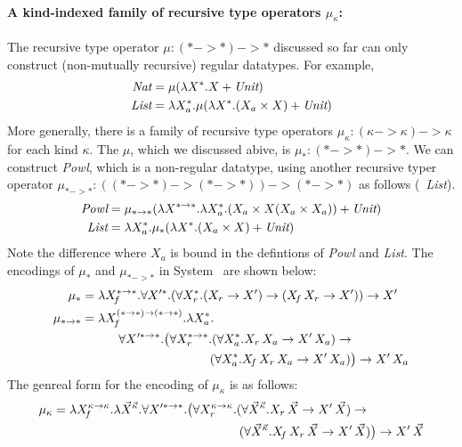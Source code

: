 \paragraph{A kind-indexed family of recursive type operators $\mu_\kappa$:}
The recursive type operator $\mu : (* -> *) -> *$ discussed so far can only
construct (non-mutually recursive) regular datatypes. For example,
\begin{align*}
\textit{Nat} &= \mu(\lambda X^{*}.X + \textit{Unit}) \\
\textit{List} &= \lambda X_a^{*}.\mu(\lambda X^{*}.(X_a\times X) + \textit{Unit})
\end{align*}
More generally, there is a family of recursive type operators
$\mu_\kappa : (\kappa -> \kappa) -> \kappa$ for each kind $\kappa$.
The $\mu$, which we discussed abive, is $\mu_{*} : (* -> *) -> *$.
We can construct \textit{Powl}, which is a non-regular datatype, using another
recursive typer operator $\mu_{* -> *} : ((*-> *) -> (*-> *)) -> (*-> *) $
as follows (\cf\ \textit{List}).
\begin{align*}
\textit{Powl} &= \mu_{* -> *}(\lambda X^{* -> *}.\lambda X_a^{*}.
			(X_a\times X(X_a\times X_a)) + \textit{Unit}) \\
\textit{List} &= \lambda X_a^{*}.\mu_{*}(\lambda X^{*}.(X_a\times X) + \textit{Unit})
\end{align*}
Note the difference where $X_a$ is bound in the defintions of \textit{Powl}
and \textit{List}. The encodings of $\mu_{*}$ and $\mu_{*-> *}$ in System \Fw\ 
are shown below:
\begin{align*}
\mu_{*} &=
 \lambda X_{\!f}^{* -> *}.\forall X'^{*}.
 (\forall X_r^{*}.(X_r -> X') -> (X_{\!f}\,X_r -> X')) -> X' \\
\mu_{* -> *} &=
 \lambda X_{\!f}^{(*-> *) -> (*-> *)}.\lambda X_a^{*}.\\&\qquad\quad \forall X'^{*-> *}.
 \big(\forall X_r^{*-> *}.
 	(\forall X_a^{*}.X_r\,X_a -> X'\,X_a) -> \\&\qquad\qquad\qquad\qquad\qquad~
	(\forall X_a^{*}.X_{\!f}\,X_r\,X_a -> X'\,X_a)\big) -> X'\,X_a
\end{align*}
The genreal form for the encoding of $\mu_\kappa$
is as follows:
\begin{align*}
\mu_{\kappa} &=
 \lambda X_{\!f}^{\kappa -> \kappa}.\lambda \vec{X}^{\vec{\kappa}}.
 \forall X'^{*-> *}.
 \big(\forall X_r^{\kappa -> \kappa}.
 (\forall \vec{X}^{\vec{\kappa}}.X_r\,\vec{X} -> X'\,\vec{X}) -> \\
 &\qquad\qquad\qquad\qquad\qquad\qquad\qquad\quad
 (\forall \vec{X}^{\vec{\kappa}}.X_{\!f}\,X_r\,\vec{X} -> X'\,\vec{X})
 \big) -> X'\,\vec{X}
\end{align*}
